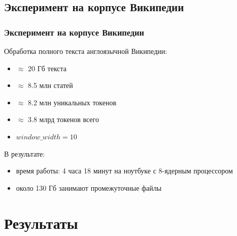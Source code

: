\documentclass[unicode]{beamer}
\begin{document}
\subsection{Эксперимент на корпусе Википедии}
\begin{frame}
\frametitle{Эксперимент на корпусе Википедии}
Обработка полного текста англоязычной Википедии:
\begin{itemize}
    \item $\approx$ 20 Гб текста
    \item $\approx$ 8.5 млн статей
    \item $\approx$ 8.2 млн уникальных токенов
    \item $\approx$ 3.8 млрд токенов всего
    \item $window\_width = 10$
\end{itemize}

В результате:
\begin{itemize}
    \item время работы: 4 часа 18 минут на ноутбуке с 8-ядерным процессором
    \item около 130 Гб занимают промежуточные файлы
\end{itemize}
\end{frame}

\section{Результаты}
\end{document}
